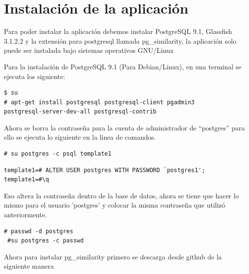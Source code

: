  
\chapter{Instalación de la aplicación}

Para poder instalar la aplicación debemos instalar PostgreSQL 9.1, Glassfish 3.1.2.2 y la extensión
para postgresql llamada pg\_similarity, la aplicación solo puede ser instalada bajo sistemas
operativos GNU/Linux


Para la instalación de PostgreSQL 9.1 (Para Debian/Linux), en una terminal se ejecuta los siguiente:\\

\begin{lstlisting}
$ su
# apt-get install postgresql postgresql-client pgadmin3
postgresql-server-dev-all postgresql-contrib
\end{lstlisting}

Ahora se borra la contraseña para la cuenta de  administrador de ``postgres'' para ello se ejecuta lo
siguiente en la linea de comandos. \\

\begin{lstlisting}
# su postgres -c psql template1
\end{lstlisting}

\begin{lstlisting}
template1=# ALTER USER postgres WITH PASSWORD `postgres1';
template1=#\q
\end{lstlisting}

Eso altera la contraseña dentro de la base de datos, ahora se tiene que hacer lo mismo para el  
usuario 'postgres' y colocar la misma contraseña que utilizó anteriormente. \\

\begin{lstlisting}
# passwd -d postgres
 #su postgres -c passwd
\end{lstlisting}

Ahora para instalar pg\_similarity primero se descarga desde github de la siguiente manera

